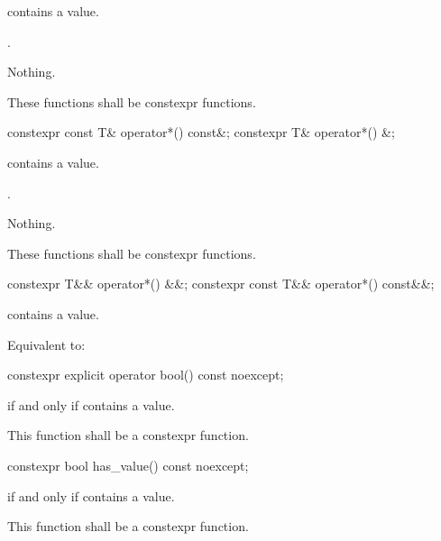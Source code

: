 \begin{itemdescr}
\pnum
\requires
{} contains a value.

\pnum
\returns
{}.

\pnum
\throws
Nothing.

\pnum
\remarks
These functions shall be constexpr functions.
\end{itemdescr}

%
\begin{itemdecl}
constexpr const T& operator*() const&;
constexpr T& operator*() &;
\end{itemdecl}

\begin{itemdescr}
\pnum
\requires
{} contains a value.

\pnum
\returns
{}.

\pnum
\throws
Nothing.

\pnum
\remarks
These functions shall be constexpr functions.
\end{itemdescr}

%
\begin{itemdecl}
constexpr T&& operator*() &&;
constexpr const T&& operator*() const&&;
\end{itemdecl}

\begin{itemdescr}
\pnum
\requires
{} contains a value.

\pnum
\effects
Equivalent to: 
\end{itemdescr}

%
\begin{itemdecl}
constexpr explicit operator bool() const noexcept;
\end{itemdecl}

\begin{itemdescr}
\pnum
\returns
{} if and only if  contains a value.

\pnum
\remarks
This function shall be a constexpr function.
\end{itemdescr}

%
\begin{itemdecl}
constexpr bool has_value() const noexcept;
\end{itemdecl}

\begin{itemdescr}
\pnum
\returns
{} if and only if  contains a value.

\pnum
\remarks
This function shall be a constexpr function.
\end{itemdescr}


